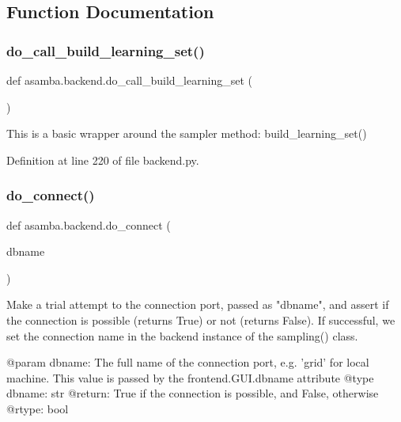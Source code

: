 \subsection{Function Documentation}
\mbox{\label{namespaceasamba_1_1backend_a46038cbb0a9dd4320c0357f78b392076}} 
\subsubsection{\texorpdfstring{do\+\_\+call\+\_\+build\+\_\+learning\+\_\+set()}{do\_call\_build\_learning\_set()}}
{\footnotesize\ttfamily def asamba.\+backend.\+do\+\_\+call\+\_\+build\+\_\+learning\+\_\+set (\begin{DoxyParamCaption}{ }\end{DoxyParamCaption})}

\begin{DoxyVerb}This is a basic wrapper around the sampler method: build_learning_set() \end{DoxyVerb}
 

Definition at line 220 of file backend.\+py.

\mbox{\label{namespaceasamba_1_1backend_aefeca01f2d6cfbd7f78c26901d48b37f}} 
\subsubsection{\texorpdfstring{do\+\_\+connect()}{do\_connect()}}
{\footnotesize\ttfamily def asamba.\+backend.\+do\+\_\+connect (\begin{DoxyParamCaption}\item[{}]{dbname }\end{DoxyParamCaption})}

\begin{DoxyVerb}Make a trial attempt to the connection port, passed as "dbname", and assert if the 
connection is possible (returns True) or not (returns False). If successful, we set
the connection name in the backend instance of the sampling() class.

@param dbname: The full name of the connection port, e.g. 'grid' for local machine. 
       This value is passed by the frontend.GUI.dbname attribute
@type dbname: str
@return: True if the connection is possible, and False, otherwise
@rtype: bool
\end{DoxyVerb}
 

